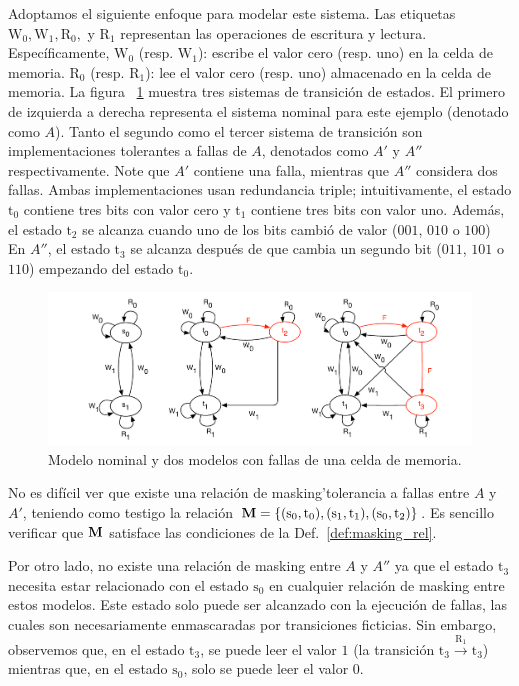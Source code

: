 \begin{example}
Adoptamos el siguiente enfoque para modelar este sistema. Las etiquetas $\text{W}_0, \text{W}_1, \text{R}_0,$ y $\text{R}_1$
representan las operaciones de escritura y lectura. Específicamente, $\text{W}_0$ (resp. $\text{W}_1$): escribe el valor cero (resp. uno) en la celda de memoria. $\text{R}_0$ (resp. $\text{R}_1$): lee el valor cero (resp. uno) almacenado en la celda de memoria.
La figura ~\ref{figure:exam_1_mem_cell} muestra tres sistemas de transición de estados. El primero de izquierda a derecha representa el sistema nominal para este ejemplo (denotado como $A$).
Tanto el segundo como el tercer sistema de transición son implementaciones tolerantes a fallas de $A$, denotados como $A'$ y $A''$ respectivamente. Note que $A'$ contiene una falla, mientras que $A''$ considera dos fallas. Ambas implementaciones usan redundancia triple; intuitivamente, el estado $\text{t}_0$ contiene tres bits con valor cero y $\text{t}_1$ contiene tres bits con valor uno.
Además, el estado $\text{t}_2$ se alcanza cuando uno de los bits cambió de valor ($001$, $010$ o $100$)
En  $A''$, el estado $\text{t}_3$ se alcanza después de que cambia un segundo bit ($011$, $101$ o $110$) empezando del estado $\text{t}_0$.
\begin{figure}[h] 
\begin{center}
    \includegraphics[scale=0.45]{Figs/example_1_cell_mem-eps-converted-to.pdf} 
    \caption{Modelo nominal y dos modelos con fallas de una celda de memoria.}
    \label{figure:exam_1_mem_cell}
\end{center}
\end{figure}
\sloppy No es difícil ver que existe una relación de masking'tolerancia a fallas entre $A$ y $A'$, teniendo como testigo la relación $\mathbin{\mathbf{M}} = \{(\text{s}_0, \text{t}_0), (\text{s}_1, \text{t}_1), (\text{s}_0, \text{t}_2)\}$. Es sencillo verificar que $\mathbin{\mathbf{M}}$ satisface las condiciones de la Def.~\ref{def:masking_rel}.

Por otro lado, no existe una relación de masking entre $A$ y $A''$ ya que el estado $\text{t}_3$ necesita estar relacionado con el estado $\text{s}_0$ en cualquier relación de masking entre estos modelos. Este estado solo puede ser alcanzado con la ejecución de fallas, las cuales son necesariamente enmascaradas por transiciones ficticias. Sin embargo, observemos que, en el estado $\text{t}_3$, se puede leer el valor $1$ (la transición $\text{t}_3 \xrightarrow{\text{R}_1} \text{t}_3$) mientras que, en el estado $\text{s}_0$, solo se puede leer el valor $0$.
\end{example}
 
